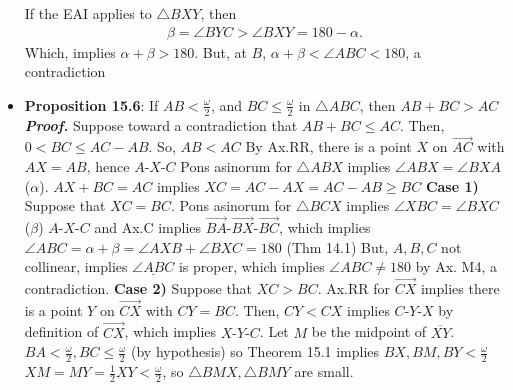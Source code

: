 \documentclass{report}
\begin{document}
\begin{itemize}
            \bigbreak \noindent 
            \bigbreak \noindent 
            If the EAI applies to $ \triangle BXY$, then 
            \begin{align*}
                \beta = \angle BYC > \angle BXY = 180 - \alpha
            .\end{align*}
            Which, implies $ \alpha + \beta > 180$. But, at $B$, $ \alpha + \beta < \angle ABC < 180$, a contradiction
        \item \textbf{Proposition 15.6}: If $AB < \frac{\omega}{2}$, and $ BC \leq \frac{\omega}{2}$ in $ \triangle ABC$, then $AB + BC > AC$
            \bigbreak \noindent 
            \textbf{\textit{Proof.}} Suppose toward a contradiction that $AB + BC \leq AC$. Then, $0 < BC \leq AC - AB$. So, $AB < AC$
            \bigbreak \noindent 
            By Ax.RR, there is a point $X$ on $\overrightarrow{AC}$ with $AX = AB$, hence $ A\text{-}X\text{-}C $
            \bigbreak \noindent 
            \bigbreak \noindent 
            Pons asinorum for $ \triangle ABX $ implies $ \angle ABX = \angle BXA$ ($\alpha $).
            \bigbreak \noindent 
            $AX + BC = AC$ implies $ XC = AC - AX = AC - AB \geq BC$ 
            \bigbreak \noindent 
            \textbf{Case 1)} Suppose that $XC = BC$. Pons asinorum for $ \triangle BCX$ implies $ \angle XBC  = \angle BXC$ ($\beta$)
            \bigbreak \noindent 
            \bigbreak \noindent 
            $ A\text{-}X\text{-}C$ and Ax.C implies $ \overrightarrow{BA}\text{-}\overrightarrow{BX}\text{-}\overrightarrow{BC} $, which implies $ \angle ABC = \alpha + \beta = \angle AXB + \angle BXC = 180$ (Thm 14.1)
            \bigbreak \noindent 
            But, $A,B,C$ not collinear, implies $ \underline{\angle ABC}$ is proper, which implies $ \angle ABC \ne 180$ by Ax. M4, a contradiction.
            \bigbreak \noindent 
            \textbf{Case 2)} Suppose that $ XC > BC$. Ax.RR for $\overrightarrow{CX}$ implies there is a point $Y$ on $\overrightarrow{CX}$ with $CY = BC$. Then, $CY < CX$ implies $ C\text{-}Y\text{-} X$ by definition of $\overrightarrow{CX}$, which implies $  X\text{-}Y\text{-}C$. 
            \bigbreak \noindent 
            Let $M$ be the midpoint of $\overline{XY}$. $BA < \frac{\omega}{2}, BC \leq \frac{\omega}{2}$ (by hypothesis) so Theorem 15.1 implies $ BX,BM,BY < \frac{\omega}{2}$
            \bigbreak \noindent 
            \bigbreak \noindent 
            $XM = MY = \frac{1}{2}XY < \frac{\omega}{2}$, so $ \triangle BMX, \triangle BMY$ are small.

\end{itemize}
\end{document}
